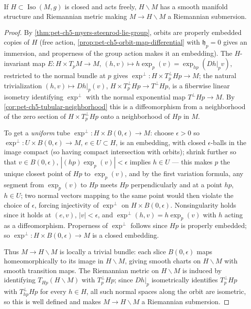 \begin{theorem}
  \label{thm:pet-ch5-free-slice-theorem}
  If $H\subset\operatorname{Iso}(M,g)$ is closed and acts freely, $H\backslash M$
  has a smooth manifold structure and Riemannian metric making $M\to H\backslash M$
  a Riemannian submersion.
\end{theorem}
\begin{proof}
  By \cref{thm:pet-ch5-myers-steenrod-lie-group}, orbits are properly embedded
  copies of $H$ (free action, \cref{prop:pet-ch5-orbit-map-differential} with
  $\mathfrak h_p=0$ gives an immersion, and properness of the group action makes it
  an embedding). The $H$-invariant map $E:H\times T_pM\to M$,
  $(h,v)\mapsto h\exp_p(v)=\exp_{hp}(Dh|_pv)$, restricted to the normal bundle at
  $p$ gives $\exp^\perp:H\times T_p^\perp Hp\to M$; the natural trivialization
  $(h,v)\mapsto Dh|_p(v)$, $H\times T_p^\perp Hp\to T^\perp Hp$, is a fiberwise
  linear isometry identifying $\exp^\perp$ with the normal exponential map
  $T^\perp Hp\to M$. By \cref{cor:pet-ch5-tubular-neighborhood} this is a
  diffeomorphism from a neighborhood of the zero section of $H\times T_p^\perp Hp$
  onto a neighborhood of $Hp$ in $M$.

  To get a \emph{uniform} tube $\exp^\perp:H\times B(0,\epsilon)\to M$: choose
  $\epsilon>0$ so $\exp^\perp:U\times B(0,\epsilon)\to M$, $e\in U\subset H$, is an
  embedding, with closed $\epsilon$-balls in the image compact (so having compact
  intersection with orbits); shrink further so that $v\in B(0,\epsilon)$,
  $|(hp)\exp_p(v)|<\epsilon$ implies $h\in U$ — this makes $p$ the unique closest
  point of $Hp$ to $\exp_p(v)$, and by the first variation formula, any segment from
  $\exp_p(v)$ to $Hp$ meets $Hp$ perpendicularly and at a point $hp$, $h\in U$; two
  normal vectors mapping to the same point would then violate the choice of
  $\epsilon$, forcing injectivity of $\exp^\perp$ on $H\times B(0,\epsilon)$.
  Nonsingularity holds since it holds at $(e,v)$, $|v|<\epsilon$, and
  $\exp^\perp(h,v)=h\exp_p(v)$ with $h$ acting as a diffeomorphism. Properness of
  $\exp^\perp$ follows since $Hp$ is properly embedded; so $\exp^\perp:H\times
  B(0,\epsilon)\to M$ is a closed embedding.

  Thus $M\to H\backslash M$ is locally a trivial bundle: each slice $B(0,\epsilon)$
  maps homeomorphically to its image in $H\backslash M$, giving smooth charts on
  $H\backslash M$ with smooth transition maps. The Riemannian metric on
  $H\backslash M$ is induced by identifying $T_{Hp}(H\backslash M)$ with
  $T_p^\perp Hp$; since $Dh|_p$ isometrically identifies $T_p^\perp Hp$ with
  $T_{hp}^\perp Hp$ for every $h\in H$, all such normal spaces along the orbit are
  isometric, so this is well defined and makes $M\to H\backslash M$ a Riemannian
  submersion.
\end{proof}

